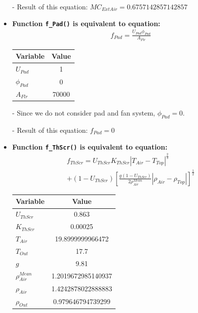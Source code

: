 \documentclass[a4paper]{article}
\numberwithin{equation}{section}
\begin{document}
\begin{itemize}
  \item[-] Result of this equation: \(MC_{ExtAir} = 0.6757142857142857\)

  \item \textbf{Function \texttt{f\_Pad()} is equivalent to equation:}\label{fPad}
        \begin{align*}
          f_{Pad} = \frac{U_{Pad} \phi_{Pad}}{A_{Flr}}
        \end{align*}

        \begin{table}[H]
          \centering
          \begin{tabular}{@{}lS@{}}
            \toprule
            \textbf{Variable} & \textbf{Value} \\
            \midrule
            \(U_{Pad}\)       & 1              \\
            \(\phi_{Pad}\)    & 0              \\
            \(A_{Flr}\)       & 70000          \\
            \bottomrule
          \end{tabular}
        \end{table}
  \item[-] Since we do not consider pad and  fan system, \(\phi_{Pad} = 0\).
  \item[-] Result of this equation: \(f_{Pad} = 0\)

  \item \textbf{Function \texttt{f\_ThScr()} is equivalent to equation:}\label{fThScr}
        \begin{multline*}
          f_{ThScr} = U_{ThScr} K_{ThScr} |T_{Air} - T_{Top}|^{\frac{2}{3}} \\
          + (1 - U_{ThScr}) {\left[\frac{g(1 - U_{ThScr})}{2\rho^{Mean}_{Air}} |\rho_{Air} - \rho_{Top}|\right]}^{\frac{1}{2}}
        \end{multline*}

        \begin{table}[H]
          \centering
          \begin{tabular}{@{}lS[table-format=2.16]@{}}
            \toprule
            \textbf{Variable}     & \textbf{Value}     \\
            \midrule
            \(U_{ThScr}\)         & 0.863              \\
            \(K_{ThScr}\)         & 0.00025            \\
            \(T_{Air}\)           & 19.8999999966472   \\
            \(T_{Out}\)           & 17.7               \\
            \(g\)                 & 9.81               \\
            \(\rho^{Mean}_{Air}\) & 1.2019672985140937 \\
            \(\rho_{Air}\)        & 1.4242878022888883 \\
            \(\rho_{Out}\)        & 0.979646794739299  \\
            \bottomrule
          \end{tabular}
        \end{table}


\end{itemize}
\end{document}
